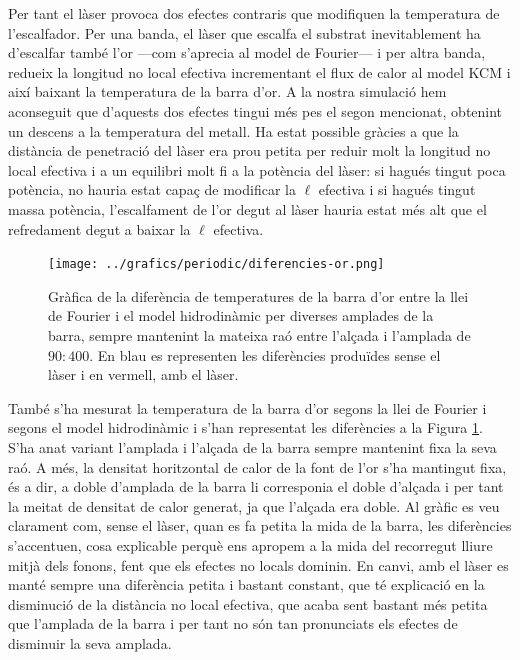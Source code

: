 \documentclass{article}
\begin{document}
Per tant el l\`{a}ser provoca dos efectes contraris que modifiquen la temperatura de l'escalfador. Per una banda, el l\`{a}ser que escalfa el substrat inevitablement ha d'escalfar tamb\'{e} l'or ---com s'aprecia al model de Fourier--- i per altra banda, redueix la longitud no local efectiva incrementant el flux de calor al model KCM i aix\'{i} baixant la temperatura de la barra d'or. A la nostra simulaci\'{o} hem aconseguit que d'aquests dos efectes tingui m\'{e}s pes el segon mencionat, obtenint un descens a la temperatura del metall. Ha estat possible gr\`{a}cies a que la dist\`{a}ncia de penetraci\'{o} del l\`{a}ser era prou petita per reduir molt la longitud no local efectiva i a un equilibri molt fi a la pot\`{e}ncia del l\`{a}ser: si hagu\'{e}s tingut poca pot\`{e}ncia, no hauria estat capa\c{c} de modificar la $\ell$ efectiva i si hagu\'{e}s tingut massa pot\`{e}ncia, l'escalfament de l'or degut al l\`{a}ser hauria estat m\'{e}s alt que el refredament degut a baixar la $\ell$ efectiva.

\begin{figure}[ht!]
\begin{center}
\texttt{[image: ../grafics/periodic/diferencies-or.png]}
\caption{Gr\`{a}fica de la difer\`{e}ncia de temperatures de la barra d'or entre la llei de Fourier i el model hidrodin\`{a}mic per diverses amplades de la barra, sempre mantenint la mateixa ra\'{o} entre l'al\c{c}ada i l'amplada de $90:400$. En blau es representen les difer\`{e}ncies produ\"{i}des sense el l\`{a}ser i en vermell, amb el l\`{a}ser.}
\label{Fig:Diferencies}
\end{center}
\end{figure}

Tamb\'{e} s'ha mesurat la temperatura de la barra d'or segons la llei de Fourier i segons el model hidrodin\`{a}mic i s'han representat les difer\`{e}ncies a la Figura \ref{Fig:Diferencies}. S'ha anat variant l'amplada i l'al\c{c}ada de la barra sempre mantenint fixa la seva ra\'{o}. A m\'{e}s, la densitat horitzontal de calor de la font de l'or s'ha mantingut fixa, \'{e}s a dir, a doble d'amplada de la barra li corresponia el doble d'al\c{c}ada i per tant la meitat de densitat de calor generat, ja que l'al\c{c}ada era doble. Al gr\`{a}fic es veu clarament com, sense el l\`{a}ser, quan es fa petita la mida de la barra, les difer\`{e}ncies s'accentuen, cosa explicable perqu\`{e} ens apropem a la mida del recorregut lliure mitj\`{a} dels fonons, fent que els efectes no locals dominin. En canvi, amb el l\`{a}ser es mant\'{e} sempre una difer\`{e}ncia petita i bastant constant, que t\'{e} explicaci\'{o} en la disminuci\'{o} de la dist\`{a}ncia no local efectiva, que acaba sent bastant m\'{e}s petita que l'amplada de la barra i per tant no s\'{o}n tan pronunciats els efectes de disminuir la seva amplada.
\end{document}
